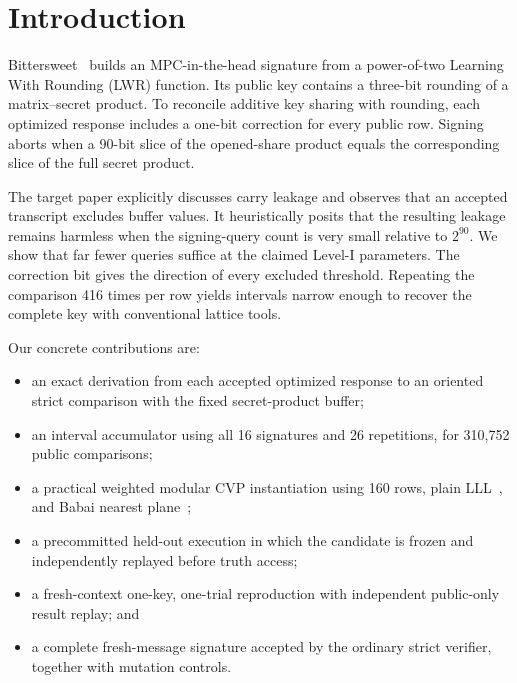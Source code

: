 \documentclass[10pt,a4paper]{article}
\begin{document}
\noindent{}

\section{Introduction}

Bittersweet~\cite{bittersweet} builds an MPC-in-the-head signature from a
power-of-two Learning With Rounding (LWR) function.  Its public key contains a
three-bit rounding of a matrix--secret product.  To reconcile additive key
sharing with rounding, each optimized response includes a one-bit correction
for every public row.  Signing aborts when a 90-bit slice of the opened-share
product equals the corresponding slice of the full secret product.

The target paper explicitly discusses carry leakage and observes that an
accepted transcript excludes buffer values.  It heuristically posits that the
resulting leakage remains harmless when the signing-query count is very small
relative to $2^{90}$.  We show that far fewer queries suffice at the claimed
Level-I parameters.  The correction bit gives the direction of every excluded
threshold.  Repeating the comparison 416 times per row yields intervals narrow
enough to recover the complete key with conventional lattice tools.

Our concrete contributions are:
\begin{itemize}
  \item an exact derivation from each accepted optimized response to an
  oriented strict comparison with the fixed secret-product buffer;
  \item an interval accumulator using all 16 signatures and 26 repetitions,
  for 310,752 public comparisons;
  \item a practical weighted modular CVP instantiation using 160 rows, plain
  LLL~\cite{lll}, and Babai nearest plane~\cite{babai};
  \item a precommitted held-out execution in which the candidate is frozen and
  independently replayed before truth access;
  \item a fresh-context one-key, one-trial reproduction with independent
  public-only result replay; and
  \item a complete fresh-message signature accepted by the ordinary strict
  verifier, together with mutation controls.
\end{itemize}
\end{document}
